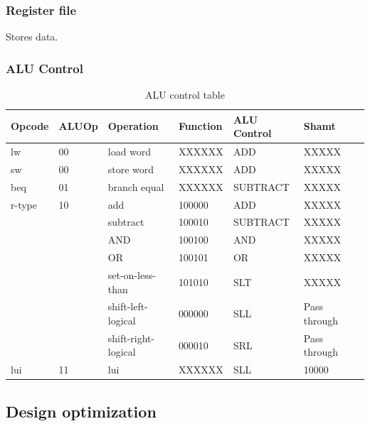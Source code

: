 \subsubsection{Register file}

Stores data.

\subsubsection{ALU Control}

\begin{table}[ht!]
    \begin{tabular}{|l|l|l|l|l|l|l|}
    \hline
    Opcode & ALUOp & Operation           & Function & ALU Control & Shamt   \\ \hline
    lw     & 00    & load word           & XXXXXX   & ADD         & XXXXX \\ \hline
    sw     & 00    & store word          & XXXXXX   & ADD         & XXXXX \\ \hline
    beq    & 01    & branch equal        & XXXXXX   & SUBTRACT    & XXXXX \\ \hline
    r-type & 10    & add                 & 100000   & ADD         & XXXXX \\ \cline{3-6}
           &       & subtract            & 100010   & SUBTRACT    & XXXXX \\ \cline{3-6}
           &       & AND                 & 100100   & AND         & XXXXX \\ \cline{3-6}
           &       & OR                  & 100101   & OR          & XXXXX \\ \cline{3-6}
           &       & set-on-less-than    & 101010   & SLT         & XXXXX \\ \cline{3-6}
           &       & shift-left-logical  & 000000   & SLL         & Pass through \\ \cline{3-6}
           &       & shift-right-logical & 000010   & SRL         & Pass through \\ \hline
    lui    & 11    & lui                 & XXXXXX   & SLL         & 10000 \\ \hline
    \end{tabular}
    \caption{ALU control table}
    \label{tab:alu-control}
\end{table}

\subsection{Design optimization}

